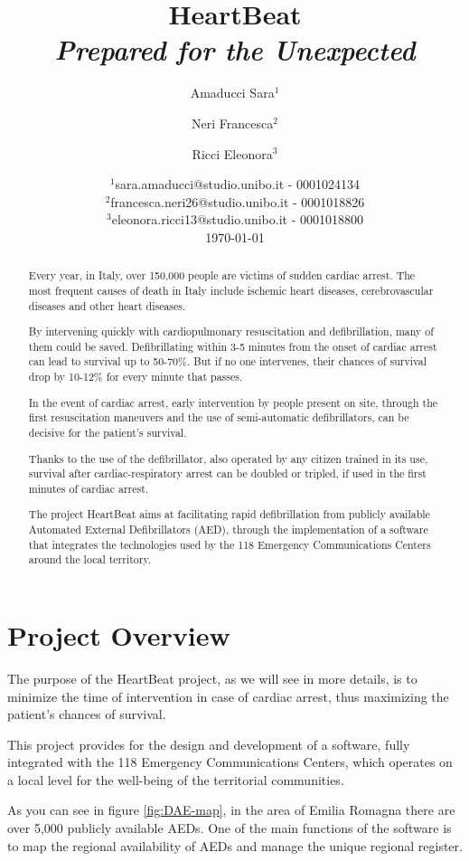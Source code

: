 \documentclass[11pt,a4paper]{article}
\title{HeartBeat \\ \small \textit{Prepared for the Unexpected}}
\author{Amaducci Sara$^1$ \and Neri Francesca$^2$ \and Ricci Eleonora$^3$}
\date{%
    $^1$sara.amaducci@studio.unibo.it - 0001024134\\
    $^2$francesca.neri26@studio.unibo.it - 0001018826\\
    $^3$eleonora.ricci13@studio.unibo.it - 0001018800\\
    \vspace{5mm}
    \today
}
\begin{document}
\maketitle

\begin{abstract}	
    Every year, in Italy, over 150,000 people are victims of sudden cardiac arrest. 
    The most frequent causes of death in Italy include ischemic heart diseases, cerebrovascular diseases and other heart diseases.
    
    By intervening quickly with cardiopulmonary resuscitation and defibrillation, many of them could be saved.
    Defibrillating within 3-5 minutes from the onset of cardiac arrest can lead to survival up to 50-70\%.
    But if no one intervenes, their chances of survival drop by 10-12\% for every minute that passes.
    
    In the event of cardiac arrest, early intervention by people present on site, through the first resuscitation maneuvers and the use of semi-automatic defibrillators, can be decisive for the patient's survival.

    Thanks to the use of the defibrillator, also operated by any citizen trained in its use, survival after cardiac-respiratory arrest can be doubled or tripled, if used in the first minutes of cardiac arrest.

    The project HeartBeat aims at facilitating rapid defibrillation from publicly available Automated External Defibrillators (AED), through the implementation of a software that integrates the technologies used by the 118 Emergency Communications Centers around the local territory.
\end{abstract}

\newpage
\tableofcontents   

\newpage
\section{Project Overview}
The purpose of the HeartBeat project, as we will see in more details, is to minimize the time of intervention in case of cardiac arrest, thus maximizing the patient's chances of survival. 

This project provides for the design and development of a software, fully integrated with the 118 Emergency Communications Centers, which operates on a local level for the well-being of the territorial communities.

As you can see in figure \ref{fig:DAE-map}, in the area of Emilia Romagna there are over 5,000 publicly available AEDs.
%
One of the main functions of the software is to map the regional availability of AEDs and manage the unique regional register. 
\end{document}
